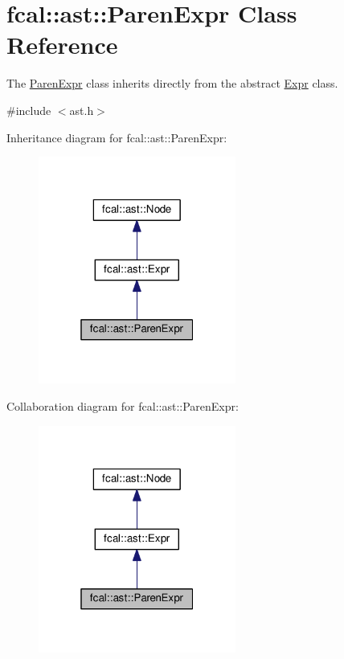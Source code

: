\hypertarget{classfcal_1_1ast_1_1ParenExpr}{}\section{fcal\+:\+:ast\+:\+:Paren\+Expr Class Reference}
\label{classfcal_1_1ast_1_1ParenExpr}


The \hyperlink{classfcal_1_1ast_1_1ParenExpr}{Paren\+Expr} class inherits directly from the abstract \hyperlink{classfcal_1_1ast_1_1Expr}{Expr} class.  




{\ttfamily \#include $<$ast.\+h$>$}



Inheritance diagram for fcal\+:\+:ast\+:\+:Paren\+Expr\+:\nopagebreak
\begin{figure}[H]
\begin{center}
\leavevmode
\includegraphics[width=184pt]{classfcal_1_1ast_1_1ParenExpr__inherit__graph}
\end{center}
\end{figure}


Collaboration diagram for fcal\+:\+:ast\+:\+:Paren\+Expr\+:\nopagebreak
\begin{figure}[H]
\begin{center}
\leavevmode
\includegraphics[width=184pt]{classfcal_1_1ast_1_1ParenExpr__coll__graph}
\end{center}
\end{figure}
